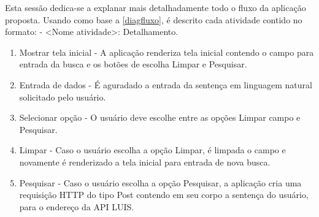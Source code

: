 Esta sessão dedica-se a explanar mais detalhadamente todo o fluxo da aplicação proposta. Usando como base a \autoref{diagfluxo}, é descrito cada atividade contido no formato: - <Nome atividade>: Detalhamento.

\begin{enumerate}
	\item Mostrar tela inicial - A aplicação renderiza tela inicial contendo o campo para entrada da busca e os botões de escolha Limpar e Pesquisar.
	\item Entrada de dados - É aguradado a entrada da sentença em linguagem natural solicitado pelo usuário.
	\item Selecionar opção - O usuário deve escolhe entre as opções Limpar campo e Pesquisar.
	\item Limpar - Caso o usuário escolha a opção Limpar, é limpada o campo e novamente é renderizado a tela inicial para entrada de nova busca.
	\item Pesquisar - Caso o usuário escolha a opção Pesquisar, a aplicação cria uma requisição HTTP do tipo Post contendo em seu corpo a sentença do usuário, para o endereço da API LUIS.
\end{enumerate}
